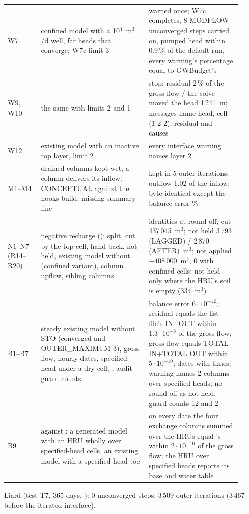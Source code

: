 \begin{longtable}{P{0.13\linewidth}P{0.42\linewidth}P{0.36\linewidth}}
W7 & confined model with a 10$^4$~m$^3$/d well, far heads that converge; W7c limit 3 & warned once; W7c completes, 8 MODFLOW-unconverged steps carried on, pumped head within 0.9\,\% of the default run, every warning's percentage equal to GWBudget's\\
W9, W10 & the same with limits 2 and 1 & stop: residual 2\,\% of the gross flow / the solve moved the head 1\,241~m; messages name head, cell (1 2 2), residual and causes\\
W12 & existing model with an inactive top layer, limit 2 & every interface warning names layer 2\\
M1--M4 & drained columns kept wet; a column delivers its inflow; CONCEPTUAL against the hooks build; missing summary line & kept in 5 outer iterations; outflow 1.02 of the inflow; byte-identical except the balance-error \%\\
N1--N7 (R14--R20) & negative recharge (): split, cut by the top cell, hand-back, not held, existing model without  (confined variant), column upflow, sibling columns & identities at round-off; cut 437\,045~m$^3$; not held 3\,793 (LAGGED) / 2\,870 (AFTER)~m$^3$; not applied $-408\,000$~m$^3$, 0 with confined cells; not held only where the HRU's soil is empty (334~m$^3$)\\
B1--B7 & steady existing model without STO (converged and OUTER\_MAXIMUM 3), gross flow, hourly dates, specified head under a dry cell, , audit guard counts & balance error $6\cdot10^{-12}$; residual equals the list file's IN$-$OUT within $1.3\cdot10^{-8}$ of the gross flow; gross flow equals TOTAL IN$+$TOTAL OUT within $5\cdot10^{-10}$; dates with times; warning names 2 columns over specified heads; no round-off as not held; guard counts 12 and 2\\
B9 &  against : a generated model with an HRU wholly over specified-head cells, an existing model with a specified-head toe & on every date the four exchange columns summed over the HRUs equal 's within $2\cdot10^{-10}$ of the gross flow; the HRU over specified heads reports its base and water table\\\bottomrule
\end{longtable}
Liard (test T7, 365 days, ): 0 unconverged steps, 3\,509 outer iterations (3\,467 before the iterated interface).
